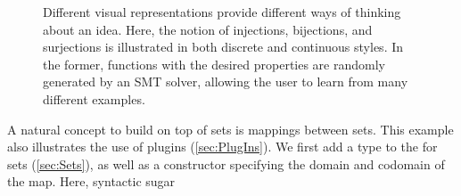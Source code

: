 \begin{figure}
\begin{minipage}[t]{\columnwidth}
   \end{minipage}
   \caption{Different visual representations provide different ways of thinking about an idea.  Here, the notion of injections, bijections, and surjections is illustrated in both discrete  and continuous  styles.  In the former, functions with the desired properties are randomly generated by an SMT solver, allowing the user to learn from many different examples.\label{fig:substance-fn-images}}
\end{figure}



   A natural concept to build on top of sets is mappings between sets. This example also illustrates the use of plugins (\cref{sec:PlugIns}).  We first add a  type to the \Domain{} for sets (\cref{sec:Sets}), as well as a constructor  specifying the domain and codomain of the map.  Here, syntactic sugar\vspace{.5\baselineskip}

   \noindent{}\vspace{.5\baselineskip}

